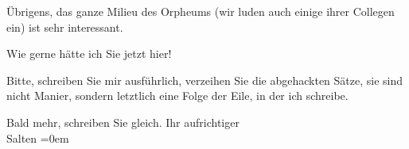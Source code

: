 \pstart
           Übrigens, das ganze Milieu des Orpheums (wir luden
               auch einige ihrer Collegen ein) ist sehr interessant.\pend
           
\pstart
           Wie gerne hätte ich Sie jetzt hier!\pend
           
\pstart
           Bitte, schreiben Sie mir ausführlich, verzeihen Sie die abgehackten Sätze, sie sind
               nicht Manier, sondern letztlich eine Folge der Eile, in der ich schreibe.\pend
           
\pstart
           Bald mehr, schreiben Sie gleich. Ihr aufrichtiger {\\[\baselineskip]}\spacefill\mbox{Salten}\pend
           \leftskip=0em{}\endnumbering{}  
      